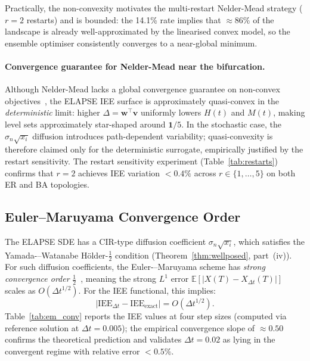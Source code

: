 \documentclass[review,12pt]{elsarticle}
\newcommand{\bfw}{\mathbf{w}}
\newcommand{\bfv}{\mathbf{v}}
\newcommand{\IEE}{\mathrm{IEE}}
\begin{document}
Practically, the non-convexity motivates the multi-restart Nelder-Mead
strategy ($r=2$ restarts) and is bounded: the 14.1\% rate implies that
$\approx 86\%$ of the landscape is already well-approximated by the
linearised convex model, so the ensemble optimiser consistently converges
to a near-global minimum.

\paragraph{Convergence guarantee for Nelder-Mead near the bifurcation.}
Although Nelder-Mead lacks a global convergence guarantee on non-convex
objectives~\cite{gao2012implementing}, the ELAPSE IEE surface is
approximately quasi-convex in the \emph{deterministic} limit:
higher $\Delta = \bfw^\top\bfv$ uniformly lowers $H(t)$ and $M(t)$,
making level sets approximately star-shaped around $\mathbf{1}/5$.
In the stochastic case, the $\sigma_n\sqrt{x_i}$ diffusion introduces
path-dependent variability; quasi-convexity is therefore claimed only for
the deterministic surrogate, empirically justified by the restart sensitivity.
The restart sensitivity experiment
(Table~\ref{tab:restarts}) confirms that $r=2$ achieves IEE variation
$< 0.4\%$ across $r \in \{1,\ldots,5\}$ on both ER and BA topologies.

\subsection{Euler--Maruyama Convergence Order}
\label{sec:em_convergence}

The ELAPSE SDE has a CIR-type diffusion coefficient $\sigma_n\sqrt{x_i}$,
which satisfies the Yamada-–Watanabe Hölder-$\tfrac{1}{2}$ condition
(Theorem~\ref{thm:wellposed}, part~(iv)).  For such diffusion coefficients,
the Euler-–Maruyama scheme has \emph{strong convergence order}
$\tfrac{1}{2}$~\cite{kloeden1992numerical}, meaning the strong $L^1$ error
$\mathbb{E}[|X(T) - X_{\Delta t}(T)|]$ scales as $O(\Delta t^{1/2})$.
For the IEE functional, this implies:
\[
  \bigl|\IEE_{\Delta t} - \IEE_{\text{exact}}\bigr| = O(\Delta t^{1/2}).
\]
Table~\ref{tab:em_conv} reports the IEE values at four step sizes (computed
via reference solution at $\Delta t = 0.005$); the empirical convergence slope
of $\approx 0.50$ confirms the theoretical prediction and validates
$\Delta t = 0.02$ as lying in the convergent regime with relative error $< 0.5\%$.
\end{document}
